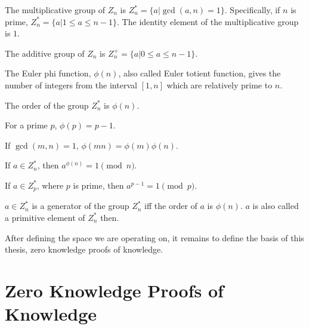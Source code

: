 \begin{defn}
  The multiplicative group of $Z_n$ is $Z_n^* = \{a | \gcd(a,n) = 1
  \}$.  Specifically, if $n$ is prime, $Z_n^* = \{a | 1 \leq a \leq n-1
  \}$. The identity element of the multiplicative group is $1$.
\end{defn}

\begin{defn}
  The additive group of $Z_n$ is $Z_n^+ = \{a | 0 \leq a \leq n-1 \}$.
\end{defn}

\begin{defn}
  The Euler phi function, $\phi(n)$, also called Euler totient
  function, gives the number of integers from the interval $[1,n]$
  which are relatively prime to $n$.
\end{defn}

\begin{corr}
  The order of the group $Z_n^*$ is $\phi(n)$.
\end{corr}

\begin{corr}
  For a prime $p$, $\phi(p) = p-1$.
\end{corr}

\begin{corr}
  If $\gcd(m, n) = 1$, $\phi(m n) = \phi(m) \phi(n)$.
\end{corr}

\begin{thm}
  If $a \in Z_n^*$, then $a^{\phi(n)} = 1 \pmod{n}$.
\end{thm}

\begin{corr}
  If $a \in Z_p^*$, where $p$ is prime, then $a^{p-1} = 1 \pmod{p}$.  
\end{corr}

\begin{corr}
  $a \in Z_n^*$ is a generator of the group $Z_n^*$ iff the order of
  $a$ is $\phi(n)$. $a$ is also called a primitive element of $Z_n^*$
  then.
\end{corr}

After defining the space we are operating on, it remains to define the
basis of this thesis, zero knowledge proofs of knowledge.

\section{Zero Knowledge Proofs of Knowledge}


